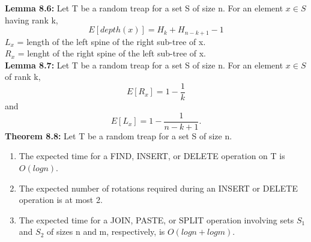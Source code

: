 \documentclass[12pt]{article}
\begin{document}
\textbf{Lemma 8.6:} Let T be a random treap for a set S of size n. For an element $x\in S$ having rank k, $$E[depth(x)]=H_k+H_{n-k+1}-1$$
$L_x$ = length of the left spine of the right sub-tree of x.\\
$R_x$ = lenght of the right spine of the left sub-tree of x.\\
\textbf{Lemma 8.7:} Let T be a random treap for a set S of size n. For an element $x\in S$ of rank k, $$E[R_x]=1-\frac{1}{k}$$ and $$E[L_x]=1-\frac{1}{n-k+1}.$$
\textbf{Theorem 8.8:} Let T be a random treap for a set S of size n. \begin{enumerate}\item The expected time for a FIND, INSERT, or DELETE operation on T is $O(logn)$.\item The expected number of rotations required during an INSERT or DELETE operation is at most 2.\item The expected time for a JOIN, PASTE, or SPLIT operation involving sets $S_1$ and $S_2$ of sizes n and m, respectively, is $O(logn+logm)$.
\end{enumerate}
\end{document}
